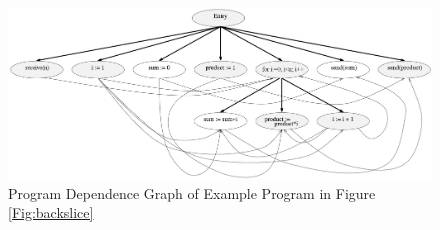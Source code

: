 \begin{figure}
  \includegraphics[width=\columnwidth,scale=0.5]{images/pdg.png}
  \caption{Program Dependence Graph of Example Program in Figure \ref{Fig:backslice}}
  \label{fig:expdg}
\end{figure}








